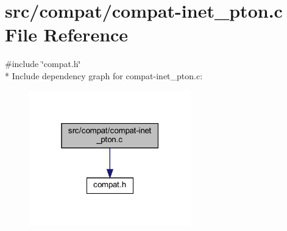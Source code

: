 \hypertarget{compat-inet__pton_8c}{}\section{src/compat/compat-\/inet\+\_\+pton.c File Reference}
\label{compat-inet__pton_8c}
{\ttfamily \#include \char`\"{}compat.\+h\char`\"{}}\\*
Include dependency graph for compat-\/inet\+\_\+pton.c\+:
\nopagebreak
\begin{figure}[H]
\begin{center}
\leavevmode
\includegraphics[width=199pt]{compat-inet__pton_8c__incl}
\end{center}
\end{figure}
